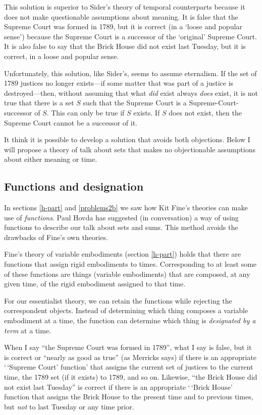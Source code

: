 \documentclass[11pt]{article}
\begin{document}
\begin{spacing}{1.5}
This solution is superior to Sider's theory of temporal counterparts
because it does not make questionable assumptions about meaning.  It
is false that the Supreme Court was formed in 1789, but it is correct
(in a `loose and popular sense') because the Supreme Court is a
successor of the `original' Supreme Court.  It is also false to say
that the Brick House did not exist last Tuesday, but it is correct, in
a loose and popular sense.

Unfortunately, this solution, like Sider's, seems to assume
eternalism.  If the set of 1789 justices no longer exists---if some
matter that was part of a justice is destroyed---then, without
assuming that what {\em did} exist always {\em does} exist, it is not
true that there is a set $S$ such that the Supreme Court is a
Supreme-Court-successor of $S$.  This can only be true if $S$ exists.
If $S$ does not exist, then the Supreme Court cannot be a successor of
it.

It think it is possible to develop a solution that avoids both
objections.  Below I will propose a theory of talk about sets that
makes no objectionable assumptions about either meaning or time.

\subsection{Functions and designation}
\label{fundeg}
In sections \ref{h-part} and \ref{problems2b} we saw how Kit Fine's
theories can make use of {\em functions}.  Paul Hovda has suggested
(in conversation) a way of using functions to describe our talk about
sets and sums.  This method avoids the drawbacks of Fine's own
theories.

Fine's theory of variable embodiments (section \ref{h-part}) holds
that there are functions that assign rigid embodiments to times.
Corresponding to at least some of these functions are things (variable
embodiments) that are composed, at any given time, of the rigid
embodiment assigned to that time.

For our essentialist theory, we can retain the functions while
rejecting the correspondent objects.  Instead of determining which
thing composes a variable embodiment at a time, the function can
determine which thing is {\em designated by a term} at a time.

When I say ``the Supreme Court was formed in 1789'', what I say is
false, but it is correct or ``nearly as good as true'' (as Merricks
says) if there is an appropriate `\,`Supreme Court' function' that assigns
the current set of justices to the current time, the 1789 set (if it
exists) to 1789, and so on.  Likewise, ``the Brick House did not exist
last Tuesday'' is correct if there is an appropriate `\,`Brick House'
function that assigns the Brick House to the present time and to
previous times, but {\em not} to last Tuesday or any time prior.


\end{spacing}
\end{document}
